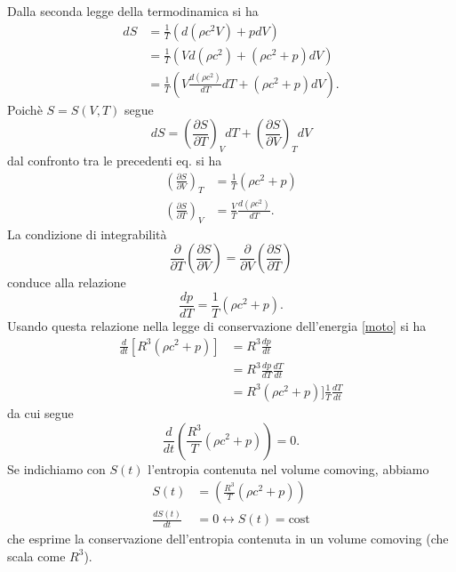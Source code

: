 Dalla seconda legge della termodinamica si ha
\begin{equation}
  \begin{split}
    dS &=  \frac{1}{T} \left( d( \rho c^2 V) + p dV \right) \\
    &= \frac{1}{T} \left( V d(\rho c^2) + (\rho c^2+p) dV \right) \\
    &= \frac{1}{T} \left( V \frac{d(\rho c^2)}{dT} dT + (\rho c^2+p) dV \right).
  \end{split}
\end{equation}
Poichè $S=S(V,T)$ segue
\begin{equation}
  dS = \left( \frac{\partial S}{\partial T} \right)_V dT+ \left( \frac{\partial
      S}{\partial V} \right)_T dV
\end{equation}
dal confronto tra le precedenti eq. si ha
\begin{subequations}
  \begin{align}
    \left(\frac{\partial S}{\partial V}\right)_T &= \frac{1}{T} (\rho c^2+p) \\
    \left(\frac{\partial S}{\partial T} \right)_V &= \frac{V}{T} \frac{d (\rho
                                                    c^2)}{dT}.
  \end{align}
\end{subequations}
La condizione di integrabilità
\begin{equation}
  \frac{\partial}{\partial T} \left( \frac{\partial S}{\partial V} \right) =
  \frac{\partial}{\partial V} \left( \frac{\partial S}{\partial T} \right)
\end{equation}
conduce alla relazione
\begin{equation}
  \frac{dp}{dT} = \frac{1}{T} (\rho c^2 +p).
  \label{integrab}
\end{equation}
Usando questa relazione nella legge di conservazione dell'energia \eqref{moto}
si ha
\begin{equation}
  \begin{split}
    \frac{d}{dt} [R^3(\rho c^2 +p)] & = R^3 \frac{dp}{dt} \\
    & = R^3 \frac{dp}{dT} \frac{dT}{dt} \\
    & = R^3 (\rho c^2 +p)] \frac{1}{T} \frac{dT}{dt}
  \end{split}
\end{equation}
da cui segue
\begin{equation}
  \frac{d}{dt} \left( \frac{R^3}{T} (\rho c^2 + p) \right) = 0.
\end{equation}
Se indichiamo con $S(t)$ l'entropia contenuta nel volume comoving, abbiamo
\begin{subequations}
  \begin{align}
    S(t) & =  \left( \frac{R^3}{T} (\rho c^2 + p) \right) \\
    \frac{dS(t)}{dt} & = 0 \longleftrightarrow S(t)= \text{cost}
  \end{align}
  \label{cons_entropia}
\end{subequations}
che esprime la conservazione dell'entropia contenuta in un volume comoving (che
scala come $R^3$).

